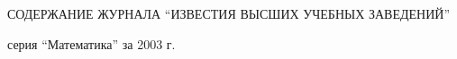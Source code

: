

















\newcommand{\tl}[3]{\noindent{\bf#1}\ #2 \dotfill #3 \par} 


\setcounter{page}{83}


\pagestyle{plain}





\par


\vskip 2cm


\par


\bigskip


\bigskip


\bigskip


\par


{\centerline{\Large СОДЕРЖАНИЕ ЖУРНАЛА ``ИЗВЕСТИЯ ВЫСШИХ УЧЕБНЫХ ЗАВЕДЕНИЙ''}}





{\centerline{\Large серия ``Математика'' за 2003 г.}}


\bigskip


\bigskip

























